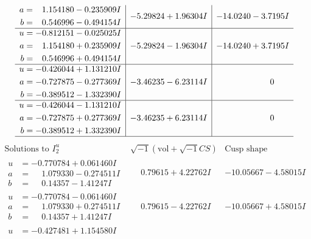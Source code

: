 \documentclass[1p]{elsarticle_modified}
\theoremstyle{definition}
\newcommand{\I}{\sqrt{-1}}
\begin{document}
$$\begin{array}{c|c|c}
\begin{aligned}
a &= \phantom{-}1.154180 - 0.235909 I \\
b &= \phantom{-}0.546996 - 0.494154 I\end{aligned}
 & -5.29824 + 1.96304 I & -14.0240 - 3.7195 I \\ \hline\begin{aligned}
u &= -0.812151 - 0.025025 I \\
a &= \phantom{-}1.154180 + 0.235909 I \\
b &= \phantom{-}0.546996 + 0.494154 I\end{aligned}
 & -5.29824 - 1.96304 I & -14.0240 + 3.7195 I \\ \hline\begin{aligned}
u &= -0.426044 + 1.131210 I \\
a &= -0.727875 - 0.277369 I \\
b &= -0.389512 - 1.332390 I\end{aligned}
 & -3.46235 - 6.23114 I & \phantom{-0.000000 } 0 \\ \hline\begin{aligned}
u &= -0.426044 - 1.131210 I \\
a &= -0.727875 + 0.277369 I \\
b &= -0.389512 + 1.332390 I\end{aligned}
 & -3.46235 + 6.23114 I & \phantom{-0.000000 } 0\\
 \hline 
 \end{array}$$\newpage$$\begin{array}{c|c|c}  
\text{Solutions to }I^u_{2}& \I (\text{vol} + \sqrt{-1}CS) & \text{Cusp shape}\\
 \hline 
\begin{aligned}
u &= -0.770784 + 0.061460 I \\
a &= \phantom{-}1.079330 - 0.274511 I \\
b &= \phantom{-}0.14357 - 1.41247 I\end{aligned}
 & \phantom{-}0.79615 + 4.22762 I & -10.05667 - 4.58015 I \\ \hline\begin{aligned}
u &= -0.770784 - 0.061460 I \\
a &= \phantom{-}1.079330 + 0.274511 I \\
b &= \phantom{-}0.14357 + 1.41247 I\end{aligned}
 & \phantom{-}0.79615 - 4.22762 I & -10.05667 + 4.58015 I \\ \hline\begin{aligned}
u &= -0.427481 + 1.154580 I \\

\end{aligned}
\end{array}$$
\end{document}
